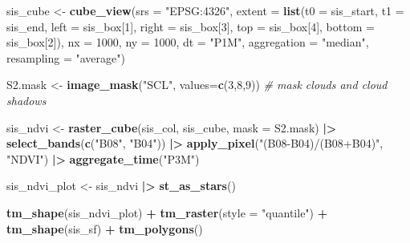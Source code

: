 \documentclass[
]{article}
\newenvironment{Shaded}{\begin{snugshade}}{\end{snugshade}}
\newcommand{\AttributeTok}[1]{\textcolor[rgb]{0.13,0.29,0.53}{#1}}
\newcommand{\CommentTok}[1]{\textcolor[rgb]{0.56,0.35,0.01}{\textit{#1}}}
\newcommand{\DecValTok}[1]{\textcolor[rgb]{0.00,0.00,0.81}{#1}}
\newcommand{\FunctionTok}[1]{\textcolor[rgb]{0.13,0.29,0.53}{\textbf{#1}}}
\newcommand{\NormalTok}[1]{#1}
\newcommand{\OtherTok}[1]{\textcolor[rgb]{0.56,0.35,0.01}{#1}}
\newcommand{\SpecialCharTok}[1]{\textcolor[rgb]{0.81,0.36,0.00}{\textbf{#1}}}
\newcommand{\StringTok}[1]{\textcolor[rgb]{0.31,0.60,0.02}{#1}}
\begin{document}
\begin{Shaded}
\begin{Highlighting}[]
\NormalTok{sis\_cube }\OtherTok{\textless{}{-}} \FunctionTok{cube\_view}\NormalTok{(}\AttributeTok{srs =} \StringTok{"EPSG:4326"}\NormalTok{,  }
                  \AttributeTok{extent =} \FunctionTok{list}\NormalTok{(}\AttributeTok{t0 =}\NormalTok{ sis\_start, }\AttributeTok{t1 =}\NormalTok{ sis\_end,}
                                \AttributeTok{left =}\NormalTok{ sis\_box[}\DecValTok{1}\NormalTok{], }\AttributeTok{right =}\NormalTok{ sis\_box[}\DecValTok{3}\NormalTok{],}
                                \AttributeTok{top =}\NormalTok{ sis\_box[}\DecValTok{4}\NormalTok{], }\AttributeTok{bottom =}\NormalTok{ sis\_box[}\DecValTok{2}\NormalTok{]),}
                  \AttributeTok{nx =} \DecValTok{1000}\NormalTok{, }\AttributeTok{ny =} \DecValTok{1000}\NormalTok{, }\AttributeTok{dt =} \StringTok{"P1M"}\NormalTok{,}
                  \AttributeTok{aggregation =} \StringTok{"median"}\NormalTok{, }\AttributeTok{resampling =} \StringTok{"average"}\NormalTok{)}

\NormalTok{S2.mask }\OtherTok{\textless{}{-}} \FunctionTok{image\_mask}\NormalTok{(}\StringTok{"SCL"}\NormalTok{, }\AttributeTok{values=}\FunctionTok{c}\NormalTok{(}\DecValTok{3}\NormalTok{,}\DecValTok{8}\NormalTok{,}\DecValTok{9}\NormalTok{)) }\CommentTok{\# mask clouds and cloud shadows}

\NormalTok{sis\_ndvi }\OtherTok{\textless{}{-}} 
  \FunctionTok{raster\_cube}\NormalTok{(sis\_col, sis\_cube, }\AttributeTok{mask =}\NormalTok{ S2.mask) }\SpecialCharTok{|\textgreater{}}
  \FunctionTok{select\_bands}\NormalTok{(}\FunctionTok{c}\NormalTok{(}\StringTok{"B08"}\NormalTok{, }\StringTok{"B04"}\NormalTok{)) }\SpecialCharTok{|\textgreater{}}
  \FunctionTok{apply\_pixel}\NormalTok{(}\StringTok{"(B08{-}B04)/(B08+B04)"}\NormalTok{, }\StringTok{"NDVI"}\NormalTok{) }\SpecialCharTok{|\textgreater{}} \FunctionTok{aggregate\_time}\NormalTok{(}\StringTok{"P3M"}\NormalTok{)}

\NormalTok{sis\_ndvi\_plot }\OtherTok{\textless{}{-}}\NormalTok{ sis\_ndvi }\SpecialCharTok{|\textgreater{}} \FunctionTok{st\_as\_stars}\NormalTok{()}

\FunctionTok{tm\_shape}\NormalTok{(sis\_ndvi\_plot) }\SpecialCharTok{+} \FunctionTok{tm\_raster}\NormalTok{(}\AttributeTok{style =} \StringTok{"quantile"}\NormalTok{) }\SpecialCharTok{+} \FunctionTok{tm\_shape}\NormalTok{(sis\_sf) }\SpecialCharTok{+} \FunctionTok{tm\_polygons}\NormalTok{()}
\end{Highlighting}
\end{Shaded}
\end{document}
